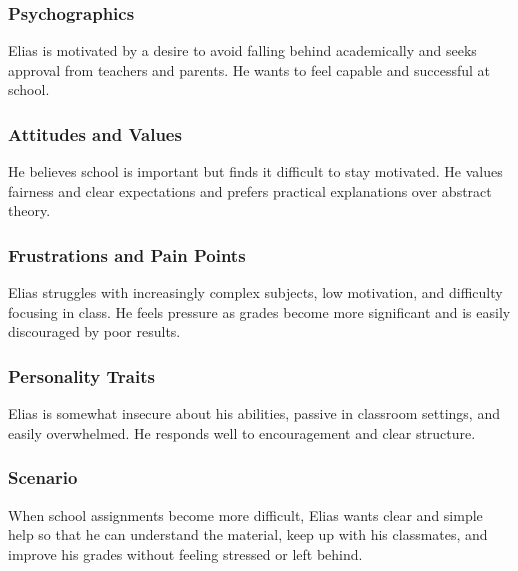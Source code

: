 \subsubsection{Psychographics}
Elias is motivated by a desire to avoid falling behind academically and seeks approval from teachers and parents. He wants to feel capable and successful at school.

\subsubsection{Attitudes and Values}
He believes school is important but finds it difficult to stay motivated. He values fairness and clear expectations and prefers practical explanations over abstract theory.

\subsubsection{Frustrations and Pain Points}
Elias struggles with increasingly complex subjects, low motivation, and difficulty focusing in class. He feels pressure as grades become more significant and is easily discouraged by poor results.

\subsubsection{Personality Traits}
Elias is somewhat insecure about his abilities, passive in classroom settings, and easily overwhelmed. He responds well to encouragement and clear structure.

\subsubsection{Scenario}
When school assignments become more difficult, Elias wants clear and simple help so that he can understand the material, keep up with his classmates, and improve his grades without feeling stressed or left behind.
